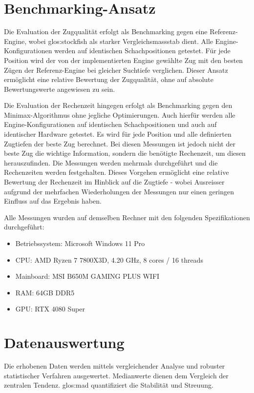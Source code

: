 \section{Benchmarking-Ansatz}
Die Evaluation der Zugqualität erfolgt als Benchmarking gegen eine Referenz-Engine, wobei \gls{glos:stockfish} als starker Vergleichsmassstab dient.
Alle Engine-Konfigurationen werden auf identischen Schachpositionen getestet.
Für jede Position wird der von der implementierten Engine gewählte Zug mit den besten Zügen der Referenz-Engine bei gleicher Suchtiefe verglichen.
Dieser Ansatz ermöglicht eine relative Bewertung der Zugqualität, ohne auf absolute Bewertungswerte angewiesen zu sein.

Die Evaluation der Rechenzeit hingegen erfolgt als Benchmarking gegen den Minimax-Algorithmus ohne jegliche Optimierungen.
Auch hierfür werden alle Engine-Konfigurationen auf identischen Schachpositionen und auch auf identischer Hardware getestet.
Es wird für jede Position und alle definierten Zugtiefen der beste Zug berechnet.
Bei diesen Messungen ist jedoch nicht der beste Zug die wichtige Information, sondern die benötigte Rechenzeit, um diesen herauszufinden.
Die Messungen werden mehrmals durchgeführt und die Rechenzeiten werden festgehalten.
Dieses Vorgehen ermöglicht eine relative Bewertung der Rechenzeit im Hinblick auf die Zugtiefe - wobei Ausreisser aufgrund der mehrfachen Wiederholungen der Messungen nur einen geringen Einfluss auf das Ergebnis haben.

Alle Messungen wurden auf demselben Rechner mit den folgenden Spezifikationen durchgeführt:
\begin{itemize}
    \item Betriebssystem: Microsoft Windows 11 Pro
    \item CPU: AMD Ryzen 7 7800X3D, 4.20 GHz, 8 cores / 16 threads
    \item Mainboard: MSI B650M GAMING PLUS WIFI
    \item RAM: 64GB DDR5
    \item GPU: RTX 4080 Super
\end{itemize}

\section{Datenauswertung}
Die erhobenen Daten werden mittels vergleichender Analyse und robuster statistischer Verfahren ausgewertet.
Medianwerte dienen dem Vergleich der zentralen Tendenz.
\gls{glos:mad} quantifiziert die Stabilität und Streuung.

